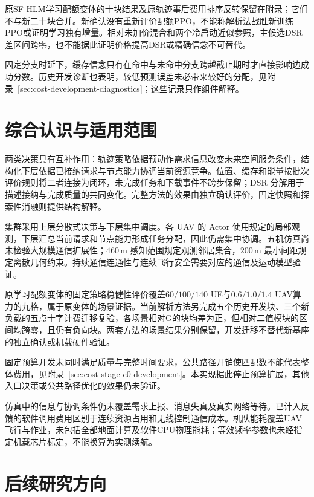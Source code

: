 原SF-HLM学习配额变体的十块结果及原轨迹事后费用排序反转保留在附录；它们不与新二十块合并。新确认没有重新评价配额PPO，不能称解析法战胜新训练PPO或证明学习独有增量。相对未加价混合和两个冷启动近似参照，主候选DSR差区间跨零，也不能据此证明价格提高DSR或精确信念不可替代。

固定分支时延下，缓存信念只有在命中与未命中分支跨越截止期时才直接影响边成功分数。历史开发诊断也表明，较低预测误差未必带来较好的分配，见附录~\ref{sec:cost-development-diagnostics}；这些记录只作组件解释。

\section{综合认识与适用范围}
\label{sec:ch6-interpretation}

两类决策具有互补作用：轨迹策略依据预动作需求信息改变未来空间服务条件，结构化下层依据已接纳请求与节点能力协调当前资源竞争。位置、缓存和能量按批次评价规则将二者连接为闭环，未完成任务和下载事件不跨步保留；DSR 分解用于描述接纳与完成质量的共同变化。完整方法的效果由独立确认评价，固定快照和探索性消融则提供结构解释。

集群采用上层分散式决策与下层集中调度。各 UAV 的 Actor 使用规定的局部观测，下层汇总当前请求和节点能力形成任务分配，因此仍需集中协调。五机仿真尚未检验大规模通信扩展性；$460\,\mathrm{m}$ 感知范围规定观测邻居集合，$200\,\mathrm{m}$ 最小间距规定离散几何约束。持续通信连通性与连续飞行安全需要对应的通信及运动模型验证。

原学习配额变体的固定策略稳健性评价覆盖$60/100/140$ UE与$0.6/1.0/1.4$ UAV算力的九格，属于原变体的场景证据。当前解析方法另完成五个历史开发块、三个新负载的五点十字计费迁移复验，各场景相对G的块均差为正，但相对二值模块的区间均跨零，且仍有负向块。两套方法的场景结果分别保留，开发迁移不替代新基座的独立确认或机载硬件验证。

固定预算开发未同时满足质量与完整时间要求，公共路径开销使匹配数不能代表整体费用，见附录~\ref{sec:cost-stage-c0-development}。本实现据此停止预算扩展，其他入口决策或公共路径优化的效果仍未验证。

仿真中的信息与协调条件仍未覆盖需求上报、消息失真及真实网络等待。已计入反馈的软件调用费用区别于连续资源占用和无线控制通信成本。机队能耗覆盖UAV飞行与作业，未包括全部地面计算及软件CPU物理能耗；等效频率参数也未经指定机载芯片标定，不能换算为实测续航。

\section{后续研究方向}
\label{sec:ch6-future}

